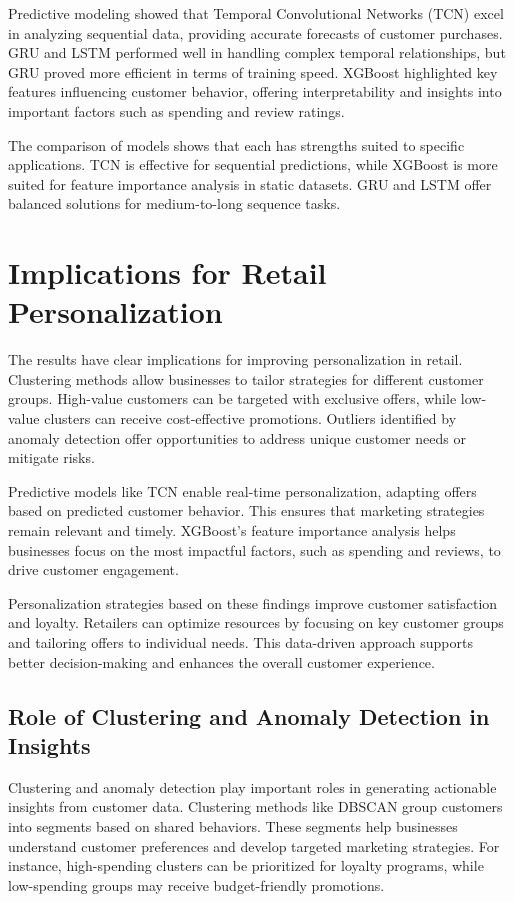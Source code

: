 \documentclass[12pt, a4paper,twoside]{report}
\theoremstyle{plain} %
\theoremstyle{definition} %
\theoremstyle{remark} %
\numberwithin{equation}{chapter}
\begin{document}
Predictive modeling showed that Temporal Convolutional Networks (TCN) excel in analyzing sequential data, providing accurate forecasts of customer purchases. GRU and LSTM performed well in handling complex temporal relationships, but GRU proved more efficient in terms of training speed. XGBoost highlighted key features influencing customer behavior, offering interpretability and insights into important factors such as spending and review ratings.

The comparison of models shows that each has strengths suited to specific applications. TCN is effective for sequential predictions, while XGBoost is more suited for feature importance analysis in static datasets. GRU and LSTM offer balanced solutions for medium-to-long sequence tasks.

\section{Implications for Retail Personalization}

The results have clear implications for improving personalization in retail. Clustering methods allow businesses to tailor strategies for different customer groups. High-value customers can be targeted with exclusive offers, while low-value clusters can receive cost-effective promotions. Outliers identified by anomaly detection offer opportunities to address unique customer needs or mitigate risks.

Predictive models like TCN enable real-time personalization, adapting offers based on predicted customer behavior. This ensures that marketing strategies remain relevant and timely. XGBoost's feature importance analysis helps businesses focus on the most impactful factors, such as spending and reviews, to drive customer engagement.

Personalization strategies based on these findings improve customer satisfaction and loyalty. Retailers can optimize resources by focusing on key customer groups and tailoring offers to individual needs. This data-driven approach supports better decision-making and enhances the overall customer experience.

\subsection{Role of Clustering and Anomaly Detection in Insights}

Clustering and anomaly detection play important roles in generating actionable insights from customer data. Clustering methods like DBSCAN group customers into segments based on shared behaviors. These segments help businesses understand customer preferences and develop targeted marketing strategies. For instance, high-spending clusters can be prioritized for loyalty programs, while low-spending groups may receive budget-friendly promotions.
\end{document}
